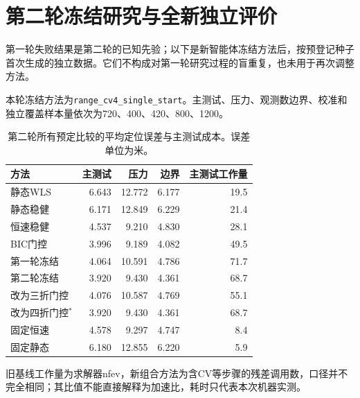 \section{第二轮冻结研究与全新独立评价}

\label{sec:revision-results}

第一轮失败结果是第二轮的已知先验；以下是新智能体冻结方法后，按预登记种子首次生成的独立数据。它们不构成对第一轮研究过程的盲重复，也未用于再次调整方法。

本轮冻结方法为\texttt{range\_\allowbreak{}cv4\_\allowbreak{}single\_\allowbreak{}start}。主测试、压力、观测数边界、校准和独立覆盖样本量依次为720、400、420、800、1200。

\begin{table}[H]\centering\small

\caption{第二轮所有预定比较的平均定位误差与主测试成本。误差单位为米。}

\begin{tabular}{@{}lrrrr@{}}\toprule

方法 & 主测试 & 压力 & 边界 & 主测试工作量\\\midrule

静态WLS & 6.643 & 12.772 & 6.177 & 19.5\\

静态稳健 & 6.171 & 12.849 & 6.229 & 21.4\\

恒速稳健 & 4.537 & 9.210 & 4.830 & 28.1\\

BIC门控 & 3.996 & 9.189 & 4.082 & 49.5\\

第一轮冻结 & 4.064 & 10.591 & 4.786 & 71.7\\

第二轮冻结 & 3.920 & 9.430 & 4.361 & 68.7\\

改为三折门控 & 4.076 & 10.587 & 4.769 & 55.1\\

改为四折门控$^{*}$ & 3.920 & 9.430 & 4.361 & 68.7\\

固定恒速 & 4.578 & 9.297 & 4.747 & 8.4\\

固定静态 & 6.180 & 12.855 & 6.220 & 5.9\\

\bottomrule\end{tabular}\end{table}

旧基线工作量为求解器nfev，新组合方法为含CV等步骤的残差调用数，口径并不完全相同；其比值不能直接解释为加速比，耗时只代表本次机器实测。

